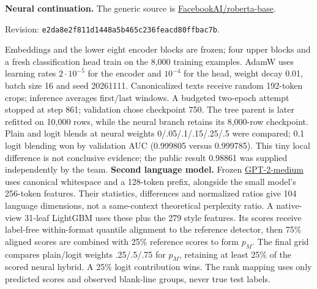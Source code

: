 \documentclass[10pt,letterpaper]{article}
\begin{document}
\textbf{Neural continuation.} The generic source is \href{https://huggingface.co/FacebookAI/roberta-base}{FacebookAI/roberta-base}.\par
Revision: \texttt{e2da8e2f811d1448a5b465c236feacd80ffbac7b}.\par
Embeddings and the lower eight encoder blocks are frozen; four upper blocks and a fresh classification head train on the 8,000 training examples. AdamW uses learning rates $2\cdot10^{-5}$ for the encoder and $10^{-4}$ for the head, weight decay 0.01, batch size 16 and seed 20261111.
Canonicalized texts receive random 192-token crops; inference averages first/last windows. A budgeted two-epoch attempt stopped at step 861; validation chose checkpoint 750. The tree parent is later refitted on 10,000 rows, while the neural branch retains its 8,000-row checkpoint.
Plain and logit blends at neural weights 0/.05/.1/.15/.25/.5 were compared; 0.1 logit blending won by validation AUC (0.999805 versus 0.999785). This tiny local difference is not conclusive evidence; the public result 0.98861 was supplied independently by the team.
\textbf{Second language model.} Frozen \href{https://huggingface.co/openai-community/gpt2-medium}{GPT-2-medium} uses canonical whitespace and a 128-token prefix, alongside the small model's 256-token features. Their statistics, differences and normalized ratios give 104 language dimensions, not a same-context theoretical perplexity ratio. A native-view 31-leaf LightGBM uses these plus the 279 style features. Its scores receive label-free within-format quantile alignment to the reference detector, then 75\% aligned scores are combined with 25\% reference scores to form $p_M$. The final grid compares plain/logit weights .25/.5/.75 for $p_M$, retaining at least 25\% of the scored neural hybrid. A 25\% logit contribution wins. The rank mapping uses only predicted scores and observed blank-line groups, never true test labels.
\end{document}
